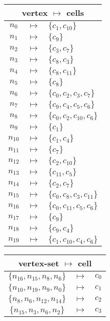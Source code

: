 \begin{figure}[H]

\sidebysidevcenter
{
\tabcolsep=0.32mm
\begin{tabular}{ccl}
\multicolumn{3}{c}{vertex $\mapsto$ cells} \\
\hline
$n_{0}$ & $\mapsto$ & $\{c_{1},c_{10}\}$ \\
$n_{1}$ & $\mapsto$ & $\{c_{9}\}$ \\
$n_{2}$ & $\mapsto$ & $\{c_{3},c_{7}\}$ \\
$n_{3}$ & $\mapsto$ & $\{c_{8},c_{3}\}$ \\
$n_{4}$ & $\mapsto$ & $\{c_{8},c_{11}\}$ \\
$n_{5}$ & $\mapsto$ & $\{c_{8}\}$ \\
$n_{6}$ & $\mapsto$ & $\{c_{0},c_{2},c_{3},c_{7}\}$ \\
$n_{7}$ & $\mapsto$ & $\{c_{9},c_{4},c_{5},c_{6}\}$ \\
$n_{8}$ & $\mapsto$ & $\{c_{0},c_{2},c_{10},c_{6}\}$ \\
$n_{9}$ & $\mapsto$ & $\{c_{1}\}$ \\
$n_{10}$ & $\mapsto$ & $\{c_{1},c_{4}\}$ \\
$n_{11}$ & $\mapsto$ & $\{c_{7}\}$ \\
$n_{12}$ & $\mapsto$ & $\{c_{2},c_{10}\}$ \\
$n_{13}$ & $\mapsto$ & $\{c_{11},c_{5}\}$ \\
$n_{14}$ & $\mapsto$ & $\{c_{2},c_{7}\}$ \\
$n_{15}$ & $\mapsto$ & $\{c_{0},c_{8},c_{3},c_{11}\}$ \\
$n_{16}$ & $\mapsto$ & $\{c_{0},c_{11},c_{5},c_{6}\}$ \\
$n_{17}$ & $\mapsto$ & $\{c_{9}\}$ \\
$n_{18}$ & $\mapsto$ & $\{c_{9},c_{4}\}$ \\
$n_{19}$ & $\mapsto$ & $\{c_{1},c_{10},c_{4},c_{6}\}$ \\
\end{tabular}
}
{
\tabcolsep=0.32mm
\begin{tabular}{ccl}
\multicolumn{3}{c}{vertex-set $\mapsto$ cell} \\
\hline
$\{n_{16},n_{15},n_{8},n_{6}\}$ & $\mapsto$ & $c_{0}$ \\
$\{n_{10},n_{19},n_{9},n_{0}\}$ & $\mapsto$ & $c_{1}$ \\
$\{n_{8},n_{6},n_{12},n_{14}\}$ & $\mapsto$ & $c_{2}$ \\
$\{n_{15},n_{3},n_{6},n_{2}\}$ & $\mapsto$ & $c_{3}$ \\

\end{tabular}}
\end{figure}
